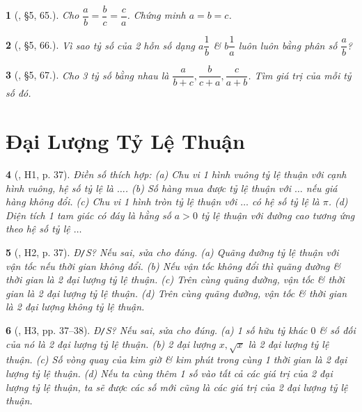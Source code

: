 \documentclass{article}
\newtheorem{baitoan}{}
\begin{document}
\begin{baitoan}[\cite{Binh_Toan_7_tap_1}, \S5, 65.]
	Cho $\dfrac{a}{b} = \dfrac{b}{c} = \dfrac{c}{a}$. Chứng minh $a = b = c$.
\end{baitoan}

\begin{baitoan}[\cite{Binh_Toan_7_tap_1}, \S5, 66.]
	Vì sao tỷ số của 2 hỗn số dạng $a\dfrac{1}{b}$ \& $b\dfrac{1}{a}$ luôn luôn bằng phân số $\dfrac{a}{b}$?
\end{baitoan}

\begin{baitoan}[\cite{Binh_Toan_7_tap_1}, \S5, 67.]
	Cho 3 tỷ số bằng nhau là $\dfrac{a}{b + c},\dfrac{b}{c + a},\dfrac{c}{a + b}$. Tìm giá trị của mỗi tỷ số đó.
\end{baitoan}


\section{Đại Lượng Tỷ Lệ Thuận}

\begin{baitoan}[\cite{Binh_boi_duong_Toan_7_tap_1}, H1, p. 37]
	Điền số thích hợp: (a) Chu vi 1 hình vuông tỷ lệ thuận với cạnh hình vuông, hệ số tỷ lệ là $\ldots$. (b) Số hàng mua được tỷ lệ thuận với $\ldots$ nếu giá hàng không đổi. (c) Chu vi 1 hình tròn tỷ lệ thuận với $\ldots$ có hệ số tỷ lệ là $\pi$. (d) Diện tích 1 tam giác có đáy là hằng số $a > 0$ tỷ lệ thuận với đường cao tương ứng theo hệ số tỷ lệ $\ldots$
\end{baitoan}

\begin{baitoan}[\cite{Binh_boi_duong_Toan_7_tap_1}, H2, p. 37]
	{\rm Đ{\tt/}S?} Nếu sai, sửa cho đúng. (a) Quãng đường tỷ lệ thuận với vận tốc nếu thời gian không đổi. (b) Nếu vận tốc không đổi thì quãng đường \& thời gian là 2 đại lượng tỷ lệ thuận. (c) Trên cùng quãng đường, vận tốc \& thời gian là 2 đại lượng tỷ lệ thuận. (d) Trên cùng quãng đường, vận tốc \& thời gian là 2 đại lượng không tỷ lệ thuận.
\end{baitoan}

\begin{baitoan}[\cite{Binh_boi_duong_Toan_7_tap_1}, H3, pp. 37--38]
	{\rm Đ{\tt/}S?} Nếu sai, sửa cho đúng. (a) 1 số hữu tỷ khác $0$ \& số đối của nó là 2 đại lượng tỷ lệ thuận. (b) 2 đại lượng $x,\sqrt{x}$ là 2 đại lượng tỷ lệ thuận. (c) Số vòng quay của kim giờ \& kim phút trong cùng 1 thời gian là 2 đại lượng tỷ lệ thuận. (d) Nếu ta cùng thêm 1 số vào tất cả các giá trị của 2 đại lượng tỷ lệ thuận, ta sẽ được các số mới cũng là các giá trị của 2 đại lượng tỷ lệ thuận.
\end{baitoan}
\end{document}
